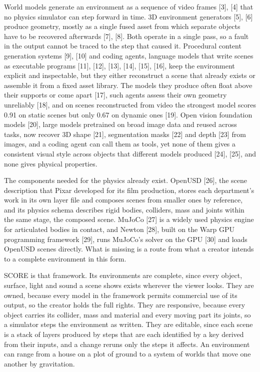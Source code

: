 \documentclass[
  11pt,
]{article}
\begin{document}
World models generate an environment as a sequence of video frames
{[}3{]}, {[}4{]} that no physics simulator can step forward in time. 3D
environment generators {[}5{]}, {[}6{]} produce geometry, mostly as a
single fused asset from which separate objects have to be recovered
afterwards {[}7{]}, {[}8{]}. Both operate in a single pass, so a fault
in the output cannot be traced to the step that caused it. Procedural
content generation systems {[}9{]}, {[}10{]} and coding agents, language
models that write scenes as executable programs {[}11{]}, {[}12{]},
{[}13{]}, {[}14{]}, {[}15{]}, {[}16{]}, keep the environment explicit
and inspectable, but they either reconstruct a scene that already exists
or assemble it from a fixed asset library. The models they produce often
float above their supports or come apart {[}17{]}, such agents assess
their own geometry unreliably {[}18{]}, and on scenes reconstructed from
video the strongest model scores 0.91 on static scenes but only 0.67 on
dynamic ones {[}19{]}. Open vision foundation models {[}20{]}, large
models pretrained on broad image data and reused across tasks, now
recover 3D shape {[}21{]}, segmentation masks {[}22{]} and depth
{[}23{]} from images, and a coding agent can call them as tools, yet
none of them gives a consistent visual style across objects that
different models produced {[}24{]}, {[}25{]}, and none gives physical
properties.

The components needed for the physics already exist. OpenUSD {[}26{]},
the scene description that Pixar developed for its film production,
stores each department's work in its own layer file and composes scenes
from smaller ones by reference, and its physics schema describes rigid
bodies, colliders, mass and joints within the same stage, the composed
scene. MuJoCo {[}27{]} is a widely used physics engine for articulated
bodies in contact, and Newton {[}28{]}, built on the Warp GPU
programming framework {[}29{]}, runs MuJoCo's solver on the GPU {[}30{]}
and loads OpenUSD scenes directly. What is missing is a route from what
a creator intends to a complete environment in this form.

SCORE is that framework. Its environments are complete, since every
object, surface, light and sound a scene shows exists wherever the
viewer looks. They are owned, because every model in the framework
permits commercial use of its output, so the creator holds the full
rights. They are responsive, because every object carries its collider,
mass and material and every moving part its joints, so a simulator steps
the environment as written. They are editable, since each scene is a
stack of layers produced by steps that are each identified by a key
derived from their inputs, and a change reruns only the steps it
affects. An environment can range from a house on a plot of ground to a
system of worlds that move one another by gravitation.
\end{document}
